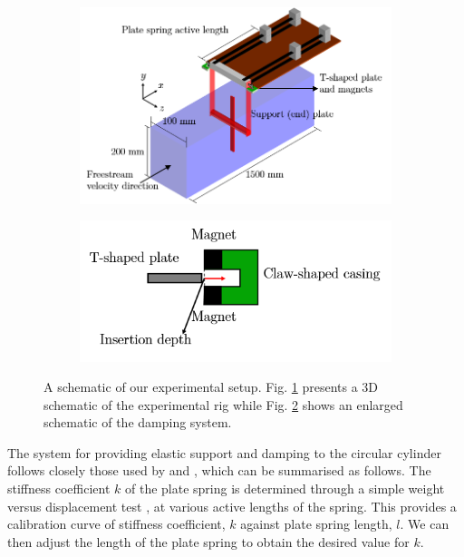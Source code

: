 \documentclass[a4paper,fleqn]{cas-sc}
\begin{document}
\begin{figure}
  \centering
  \begin{subfigure}[h]{0.5\textwidth}
    \includegraphics[width=\textwidth]{figs/figure3a}
    \caption{}
    \label{fig:rigSketch}
  \end{subfigure}

  \begin{subfigure}[h]{0.35\textwidth}
    \includegraphics[width=\textwidth]{figs/figure3b}
    \caption{}
    \label{fig:damperSketch}
  \end{subfigure}

  \caption{A schematic of our experimental setup. Fig. \ref{fig:rigSketch} presents a 3D schematic of the experimental rig while Fig. \ref{fig:damperSketch} shows an enlarged schematic of the damping system.} \label{fig:experimentalSetup}
\end{figure}

The system for providing elastic support and damping to the circular cylinder follows closely those used by \citet{Kawabata2013} and \citet{Koide2013,Koide2017}, which can be summarised as follows. The stiffness coefficient $k$ of the plate spring is determined through a simple weight versus displacement test \citep{Sun2016}, at various active lengths of the spring. This provides a calibration curve of stiffness coefficient, $k$ against plate spring length, $l$. We can then adjust the length of the plate spring to obtain the desired value for $k$.
\end{document}
